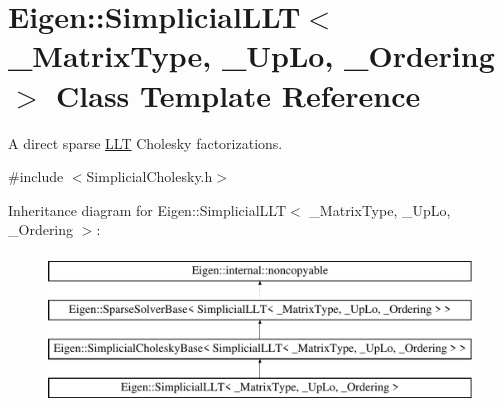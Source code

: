 \hypertarget{class_eigen_1_1_simplicial_l_l_t}{}\section{Eigen\+::Simplicial\+L\+LT$<$ \+\_\+\+Matrix\+Type, \+\_\+\+Up\+Lo, \+\_\+\+Ordering $>$ Class Template Reference}
\label{class_eigen_1_1_simplicial_l_l_t}


A direct sparse \mbox{\hyperlink{class_eigen_1_1_l_l_t}{L\+LT}} Cholesky factorizations.  




{\ttfamily \#include $<$Simplicial\+Cholesky.\+h$>$}

Inheritance diagram for Eigen\+::Simplicial\+L\+LT$<$ \+\_\+\+Matrix\+Type, \+\_\+\+Up\+Lo, \+\_\+\+Ordering $>$\+:\begin{figure}[H]
\begin{center}
\leavevmode
\includegraphics[height=4.000000cm]{class_eigen_1_1_simplicial_l_l_t}
\end{center}
\end{figure}
